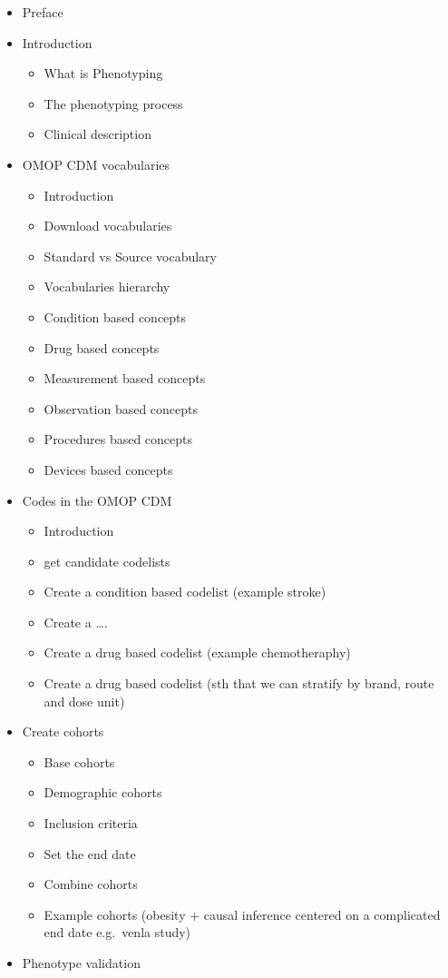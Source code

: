 \documentclass[
  letterpaper,
  oneside,
  open=any]{scrbook}
\providecommand{\tightlist}{%
  \setlength{\itemsep}{0pt}\setlength{\parskip}{0pt}}
\begin{document}
\begin{itemize}
\tightlist
\item
  Preface
\item
  Introduction

  \begin{itemize}
  \tightlist
  \item
    What is Phenotyping
  \item
    The phenotyping process
  \item
    Clinical description
  \end{itemize}
\item
  OMOP CDM vocabularies

  \begin{itemize}
  \tightlist
  \item
    Introduction
  \item
    Download vocabularies
  \item
    Standard vs Source vocabulary
  \item
    Vocabularies hierarchy
  \item
    Condition based concepts
  \item
    Drug based concepts
  \item
    Measurement based concepts
  \item
    Observation based concepts
  \item
    Procedures based concepts
  \item
    Devices based concepts
  \end{itemize}
\item
  Codes in the OMOP CDM

  \begin{itemize}
  \tightlist
  \item
    Introduction
  \item
    get candidate codelists
  \item
    Create a condition based codelist (example stroke)
  \item
    Create a \ldots.
  \item
    Create a drug based codelist (example chemotheraphy)
  \item
    Create a drug based codelist (sth that we can stratify by brand,
    route and dose unit)
  \end{itemize}
\item
  Create cohorts

  \begin{itemize}
  \tightlist
  \item
    Base cohorts
  \item
    Demographic cohorts
  \item
    Inclusion criteria
  \item
    Set the end date
  \item
    Combine cohorts
  \item
    Example cohorts (obesity + causal inference centered on a
    complicated end date e.g.~venla study)
  \end{itemize}
\item
  Phenotype validation


\end{itemize}
\end{document}
